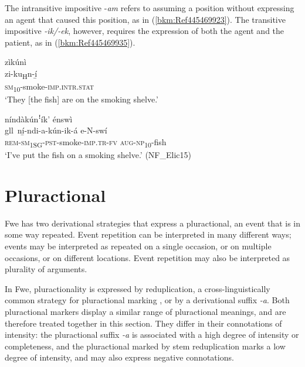 The intransitive impositive -\textit{am} refers to assuming a position without expressing an agent that caused this position, as in (\ref{bkm:Ref445469923}). The transitive impositive \textit{-ik/-ek}, however, requires the expression of both the agent and the patient, as in (\ref{bkm:Ref445469935}).

\ea
\label{bkm:Ref445469923}
\glll zìkúnì\\
zi-ku\textsubscript{H}n-í̲\\
\textsc{sm}\textsubscript{10}-smoke-\textsc{imp}.\textsc{intr}.\textsc{stat}\\
\glt ‘They [the fish] are on the smoking shelve.’
\z

\ea
\label{bkm:Ref445469935}
níndàkúnꜝík’ énswì\\
gll\ ní̲-ndi-a-kún-ik-á        e-N-swí\\
\textsc{rem}-\textsc{sm}\textsubscript{1SG}-\textsc{pst}-smoke-\textsc{imp}.\textsc{tr}-\textsc{fv}  \textsc{aug}-\textsc{np}\textsubscript{10}-fish\\
\glt ‘I’ve put the fish on a smoking shelve.’ (NF\_Elic15)
\z
\section{Pluractional}
\label{bkm:Ref489866362}\hypertarget{Toc75352664}{}
Fwe has two derivational strategies that express a pluractional, an event that is in some way repeated. Event repetition can be interpreted in many different ways; events may be interpreted as repeated on a single occasion, or on multiple occasions, or on different locations. Event repetition may also be interpreted as plurality of arguments.

\hspace*{-1.4pt}In Fwe, pluractionality is expressed by reduplication, a cross-linguistically common strategy for pluractional marking \citep[13-15]{Inkelas2014}, or by a derivational suffix \textit{-a}. Both pluractional markers display a similar range of pluractional meanings, and are therefore treated together in this section. They differ in their connotations of intensity: the pluractional suffix \textit{-a} is associated with a high degree of intensity or completeness, and the pluractional marked by stem reduplication marks a low degree of intensity, and may also express negative connotations.

\largerpage
